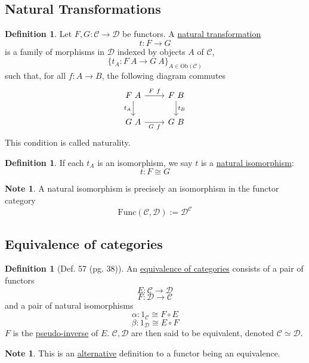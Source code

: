 \documentclass[11pt]{article} %
\theoremstyle{definition}
\newtheorem{definition}[theorem]{Definition}
\theoremstyle{definition}
\theoremstyle{definition}
\newtheorem{note}[theorem]{Note}
\begin{document}
\clearpage
\subsection{Natural Transformations}
\begin{definition}
Let $F,G:\mathcal{C} \rightarrow \mathcal{D}$ be functors.
A \underline{natural transformation}
\[t:F\rightarrow G\]
is a family of morphisms in $\mathcal{D}$ indexed by objects $A$ of $\mathcal{C}$,
\[\{t_A:F\ A \rightarrow G\ A\}_{A\in \text{Ob}(\mathcal{C})}\]
such that, for all $f:A\rightarrow B$, the following diagram commutes
\[\begin{tikzcd}
	{F\ A} & {F\ B} \\
	{G\ A} & {G\ B}
	\arrow["{F\ f}", from=1-1, to=1-2]
	\arrow["{t_A}"', from=1-1, to=2-1]
	\arrow["{G\ f}"', from=2-1, to=2-2]
	\arrow["{t_B}", from=1-2, to=2-2]
\end{tikzcd}\]
This condition is called naturality.
\end{definition}
\begin{definition}
    If each $t_A$ is an isomorphism, we say $t$ is a \underline{natural isomorphism}:
    \[t:F\cong G\]
\end{definition}

\begin{note}
	A natural isomorphism is precisely an isomorphism in the functor category 
	\[\text{Func}(\mathcal{C},\mathcal{D}):=\mathcal{D}^{\mathcal{C}}\]
\end{note}
	
\addtocounter{subsection}{3}
\subsection{Equivalence of categories}
\begin{definition}[Def. 57 (pg. 38)]
    An \underline{equivalence of categories} consists of a pair of functors
    \[E:\mathcal{C} \rightarrow \mathcal{D}\]
    \[F:\mathcal{D} \rightarrow \mathcal{C}\]
    and a pair of natural isomorphisms
    \[\alpha : 1_{\mathcal{C}} \cong F\circ E\]
    \[\beta : 1_{\mathcal{D}} \cong E\circ F\]
    $F$ is the \underline{pseudo-inverse} of $E$.
    $\mathcal{C},\mathcal{D}$ are then said to be equivalent, denoted $\mathcal{C}\simeq \mathcal{D}$.
\end{definition}
\begin{note}
    This is an \underline{alternative} definition to a functor being an equivalence.
\end{note}
\end{document}
